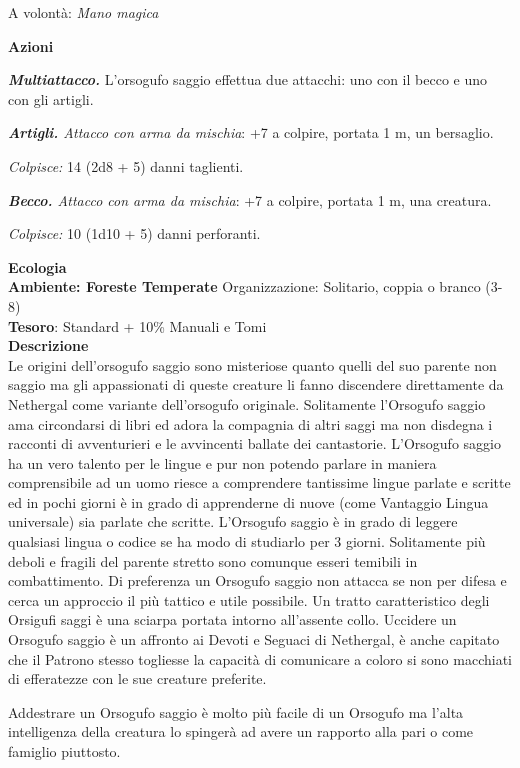 \begin{multicols}{2}
A volontà: \textit{Mano magica}

\textbf{Azioni}

\textit{\textbf{Multiattacco.}} L'orsogufo saggio effettua due attacchi: uno con il becco e uno con gli artigli.

\textit{\textbf{Artigli.} Attacco con arma da mischia}: +7 a colpire, portata 1 m, un bersaglio.

\textit{Colpisce:} 14 (2d8 + 5) danni taglienti.

\textit{\textbf{Becco.} Attacco con arma da mischia}: +7 a colpire, portata 1 m, una creatura.

\textit{Colpisce:} 10 (1d10 + 5) danni perforanti.

\textbf{Ecologia}\\
\textbf{Ambiente: Foreste Temperate}
Organizzazione: Solitario, coppia o branco (3-8)\\
\textbf{Tesoro}: Standard + 10\% Manuali e Tomi\\
\textbf{Descrizione}\\
Le origini dell'orsogufo saggio sono misteriose quanto quelli del suo parente non saggio ma gli appassionati di queste creature li fanno discendere direttamente da Nethergal come variante dell'orsogufo originale.
Solitamente l'Orsogufo saggio ama circondarsi di libri ed adora la compagnia di altri saggi ma non disdegna i racconti di avventurieri e le avvincenti ballate dei cantastorie. L'Orsogufo saggio ha un vero talento per le lingue e pur non potendo parlare in maniera comprensibile ad un uomo riesce a comprendere tantissime lingue parlate e scritte ed in pochi giorni è in grado di apprenderne di nuove (come Vantaggio Lingua universale) sia parlate che scritte. L'Orsogufo saggio è in grado di leggere qualsiasi lingua o codice se ha modo di studiarlo per 3 giorni.
Solitamente più deboli e fragili del parente stretto sono comunque esseri temibili in combattimento.
Di preferenza un Orsogufo saggio non attacca se non per difesa e cerca un approccio il più tattico e utile possibile. Un tratto caratteristico degli Orsigufi saggi è una sciarpa portata intorno all'assente collo. Uccidere un Orsogufo saggio è un affronto ai Devoti e Seguaci di Nethergal, è anche capitato che il Patrono stesso togliesse la capacità di comunicare a coloro si sono macchiati di efferatezze con le sue creature preferite.

Addestrare un Orsogufo saggio è molto più facile di un Orsogufo ma l'alta intelligenza della creatura lo spingerà ad avere un rapporto alla pari o come famiglio piuttosto.


\end{multicols}
